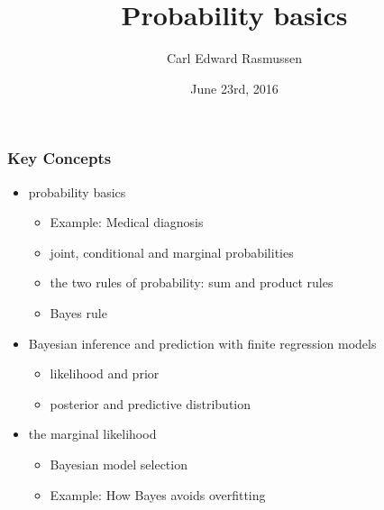 

\title{Probability basics}
\author{Carl Edward Rasmussen}
\date{June 23rd, 2016}



\begin{frame}
\titlepage
\end{frame}

\begin{frame}
\frametitle{Key Concepts}

\begin{itemize}
\item probability basics
\begin{itemize}
\item Example: Medical diagnosis
\item joint, conditional and marginal probabilities
\item the two rules of probability: sum and product rules
\item Bayes rule
\end{itemize}
\item Bayesian inference and prediction with finite regression models
\begin{itemize}
\item likelihood and prior
\item posterior and predictive distribution
\end{itemize}
\item the marginal likelihood
\begin{itemize}
\item Bayesian model selection
\item Example: How Bayes avoids overfitting
\end{itemize}
\end{itemize}
\end{frame}


